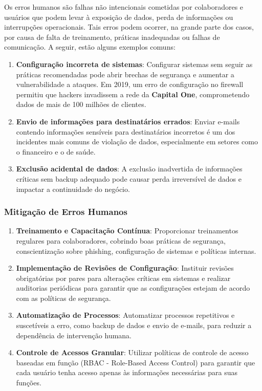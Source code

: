 \documentclass[12pt,oneside,a4paper,article]{abntex2}
\begin{document}
Os erros humanos são falhas não intencionais cometidas por colaboradores e usuários que podem levar à exposição de dados, perda de informações ou interrupções operacionais. Tais erros podem ocorrer, na grande parte dos casos, por causa de falta de treinamento, práticas inadequadas ou falhas de comunicação. A seguir, estão alguns exemplos comuns:

\begin{enumerate}
    \item \textbf{Configuração incorreta de sistemas}: Configurar sistemas sem seguir as práticas recomendadas pode abrir brechas de segurança e aumentar a vulnerabilidade a ataques. Em 2019, um erro de configuração no firewall permitiu que hackers invadissem a rede da \textbf{Capital One}, comprometendo dados de mais de 100 milhões de clientes.

    \item \textbf{Envio de informações para destinatários errados}: Enviar e-mails contendo informações sensíveis para destinatários incorretos é um dos incidentes mais comuns de violação de dados, especialmente em setores como o financeiro e o de saúde.

    \item \textbf{Exclusão acidental de dados}: A exclusão inadvertida de informações críticas sem backup adequado pode causar perda irreversível de dados e impactar a continuidade do negócio.
\end{enumerate}

\subsubsection{\textbf{Mitigação de Erros Humanos}}

\begin{enumerate}
    \item \textbf{Treinamento e Capacitação Contínua}: Proporcionar treinamentos regulares para colaboradores, cobrindo boas práticas de segurança, conscientização sobre phishing, configuração de sistemas e políticas internas.

    \item \textbf{Implementação de Revisões de Configuração}: Instituir revisões obrigatórias por pares para alterações críticas em sistemas e realizar auditorias periódicas para garantir que as configurações estejam de acordo com as políticas de segurança.

    \item \textbf{Automatização de Processos}: Automatizar processos repetitivos e suscetíveis a erro, como backup de dados e envio de e-mails, para reduzir a dependência de intervenção humana.

    \item \textbf{Controle de Acessos Granular}: Utilizar políticas de controle de acesso baseadas em função (RBAC - Role-Based Access Control) para garantir que cada usuário tenha acesso apenas às informações necessárias para suas funções.
\end{enumerate}
\end{document}

